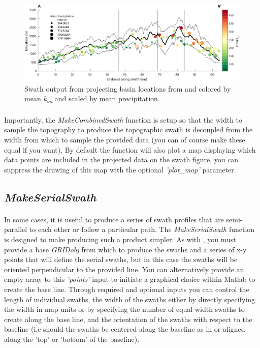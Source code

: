 \begin{figure}[H]
	\centering
	\includegraphics[width=16.5cm]{PNGs/SanGabes_KsnSwath.png}
	\caption{Swath output from  projecting basin locations from  and colored by mean \textit{k\textsubscript{sn}} and scaled by mean precipitation.}
	\label{fig:KsnSwath}
\end{figure}

\paragraph{}Importantly, the \textit{MakeCombinedSwath} function is setup so that the width to sample the topography to produce the topographic swath is decoupled from the width from which to sample the provided data (you can of course make these equal if you want). By default the function will also plot a map displaying which data points are included in the projected data on the swath figure, you can suppress the drawing of this map with the optional \textit{'plot\_map'} parameter.

\subsection{\textit{MakeSerialSwath}} \label{sec:SerSwath}
\paragraph{}In some cases, it is useful to produce a series of swath profiles that are semi-parallel to each other or follow a particular path. The \textit{MakeSerialSwath} function is designed to make producing such a product simpler. As with , you must provide a base \textit{GRIDobj} from which to produce the swaths and a series of x-y points that will define the serial swaths, but in this case the swaths will be oriented perpendicular to the provided line. You can alternatively provide an empty array to this \textit{'points'} input to initiate a graphical choice within Matlab to create the base line. Through required and optional inputs you can control the length of individual swaths, the width of the swaths either by directly specifying the width in map units or by specifying the number of equal width swaths to create along the base line, and the orientation of the swaths with respect to the baseline (i.e should the swaths be centered along the baseline as in  or aligned along the 'top' or 'bottom' of the baseline). 

